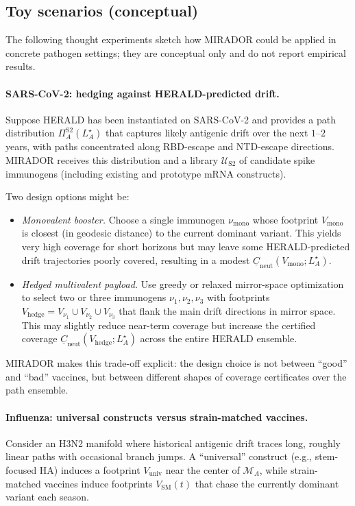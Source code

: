 \documentclass[11pt]{article}
\begin{document}
\subsection{Toy scenarios (conceptual)}
\label{subsec:toy-scenarios}

The following thought experiments sketch how MIRADOR could be applied in concrete pathogen
settings; they are conceptual only and do not report empirical results.

\paragraph{SARS-CoV-2: hedging against HERALD-predicted drift.}
Suppose HERALD has been instantiated on SARS-CoV-2 and provides a path distribution
$\Pi_A^{\mathrm{S2}}(L_A^\star)$ that captures likely antigenic drift over the next $1$–$2$ years,
with paths concentrated along RBD-escape and NTD-escape directions. MIRADOR receives this
distribution and a library $\mathcal{U}_{\mathrm{S2}}$ of candidate spike immunogens (including
existing and prototype mRNA constructs).

Two design options might be:
\begin{itemize}
  \item \emph{Monovalent booster.} Choose a single immunogen $\nu_{\mathrm{mono}}$ whose footprint
        $V_{\mathrm{mono}}$ is closest (in geodesic distance) to the current dominant variant.
        This yields very high coverage for short horizons but may leave some HERALD-predicted drift
        trajectories poorly covered, resulting in a modest
        $\underline{C}_{\mathrm{neut}}(V_{\mathrm{mono}};L_A^\star)$.
  \item \emph{Hedged multivalent payload.} Use greedy or relaxed mirror-space optimization to
        select two or three immunogens $\nu_1,\nu_2,\nu_3$ with footprints
        $V_{\mathrm{hedge}} = V_{\nu_1} \cup V_{\nu_2} \cup V_{\nu_3}$ that flank the main drift
        directions in mirror space. This may slightly reduce near-term coverage but increase the
        certified coverage $\underline{C}_{\mathrm{neut}}(V_{\mathrm{hedge}};L_A^\star)$ across the
        entire HERALD ensemble.
\end{itemize}
MIRADOR makes this trade-off explicit: the design choice is not between “good” and “bad”
vaccines, but between different shapes of coverage certificates over the path ensemble.

\paragraph{Influenza: universal constructs versus strain-matched vaccines.}
Consider an H3N2 manifold where historical antigenic drift traces long, roughly linear paths with
occasional branch jumps. A “universal” construct (e.g., stem-focused HA) induces a footprint
$V_{\mathrm{univ}}$ near the center of $\mathcal{M}_A$, while strain-matched vaccines induce
footprints $V_{\mathrm{SM}}(t)$ that chase the currently dominant variant each season.
\end{document}

